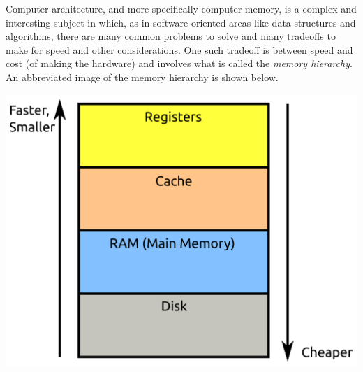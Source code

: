 \documentclass{article}
\begin{document}
Computer architecture, and more specifically computer memory, is a complex and interesting subject in which, as in software-oriented areas like data structures and algorithms, there are many common problems to solve and many tradeoffs to make for speed and other considerations. One such tradeoff is between speed and cost (of making the hardware) and involves what is called the \textit{memory hierarchy}. An abbreviated image of the memory hierarchy is shown below.

\includegraphics[scale=0.4]{memory_hierarchy}
\end{document}
